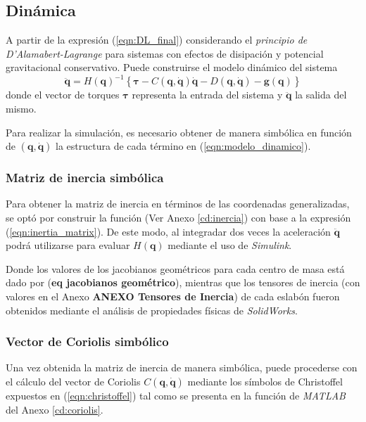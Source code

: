 \subsection{Dinámica}
    A partir de la expresión (\ref{eqn:DL_final}) considerando el \emph{principio de D'Alamabert-Lagrange} para sistemas con efectos de
    disipación y potencial gravitacional conservativo. Puede construirse el modelo dinámico del sistema 
    \begin{equation}
        \label{eqn:modelo_dinamico}
        \boldsymbol{\ddot{q}} =H(\boldsymbol{q})^{-1} \left \{ \boldsymbol{\boldsymbol{\tau}} - C(\boldsymbol{q}, \boldsymbol{\dot{q}}) \boldsymbol{\dot{q}}
        - D(\boldsymbol{q}, \boldsymbol{\dot{q}}) - \boldsymbol{g}(\boldsymbol{q}) \right \}
    \end{equation}
    donde el vector de torques $\boldsymbol{\tau}$ representa la entrada del sistema y $\boldsymbol{\ddot{q}}$ la salida del mismo. 
    
    Para realizar la simulación, es necesario obtener de manera simbólica en función de $(\boldsymbol{q}, \boldsymbol{\dot{q}})$ la estructura
    de cada término en (\ref{eqn:modelo_dinamico}). 

    \subsubsection{Matriz de inercia simbólica}
    Para obtener la matriz de inercia en términos de las coordenadas generalizadas, se optó por construir la función (Ver Anexo \ref{cd:inercia}) con base a la expresión
    (\ref{eqn:inertia_matrix}). De este modo, al integradar dos veces la aceleración $\boldsymbol{\ddot{q}}$ podrá utilizarse para evaluar $H(\boldsymbol{q})$
    mediante el uso de \emph{Simulink}. 

    Donde los valores de los jacobianos geométricos para cada centro de masa está dado por (\textbf{eq jacobianos geométrico}), mientras que los tensores de inercia (con valores
    en el Anexo \textbf{ANEXO Tensores de Inercia}) de cada eslabón fueron obtenidos mediante el análisis de propiedades físicas de \emph{SolidWorks}.

    \subsubsection{Vector de Coriolis simbólico}
    Una vez obtenida la matriz de inercia de manera simbólica, puede procederse con el cálculo del vector de Coriolis $C(\boldsymbol{q}, \boldsymbol{\dot{q}})$ mediante
    los símbolos de Christoffel expuestos en (\ref{eqn:christoffel}) tal como se presenta en la función de \emph{MATLAB} del Anexo \ref{cd:coriolis}. 

